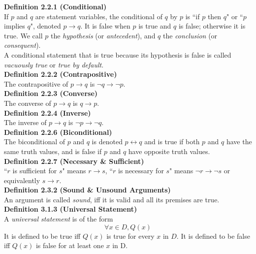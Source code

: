 \documentclass[a4paper]{article}
\newcommand{\subheading}[1]{{\scriptsize\textbf{#1}}}
\begin{document}
\begin{multicols*}{4}
\subheading{Definition 2.2.1 (Conditional)}\\
If $p$ and $q$ are statement variables, the conditional of $q$ by $p$ is ``if
$p$ then $q$" or ``$p$ implies $q$", denoted $p \rightarrow q$. It is false
when $p$ is true and $q$ is false; otherwise it is true. We call $p$ the
\textit{hypothesis} (or \textit{antecedent}), and $q$ the \textit{conclusion}
(or \textit{consequent}).\\

A conditional statement that is true because its hypothesis is false is called
\textit{vacuously true} or \textit{true by default}.\\

\subheading{Definition 2.2.2 (Contrapositive)}\\
The contrapositive of $p \rightarrow q$ is $\neg q \rightarrow \neg p$.\\

\subheading{Definition 2.2.3 (Converse)}\\
The converse of $p \rightarrow q$ is $q \rightarrow p$.\\

\subheading{Definition 2.2.4 (Inverse)}\\
The inverse of $p \rightarrow q$ is $\neg p \rightarrow \neg q$.\\

\subheading{Definition 2.2.6 (Biconditional)}\\
The biconditional of $p$ and $q$ is denoted $p \leftrightarrow q$ and is true if
both $p$ and $q$ have the same truth values, and is false if $p$ and $q$ have
opposite truth values.\\

\subheading{Definition 2.2.7 (Necessary \& Sufficient)}\\
``$r$ is sufficient for $s$" means $r \rightarrow s$, ``$r$ is necessary for
$s$" means $\neg r \rightarrow \neg s$ or equivalently $s \rightarrow r$.\\

\subheading{Definition 2.3.2 (Sound \& Unsound Arguments)}\\
An argument is called \textit{sound}, iff it is valid and all its premises are
true.\\

\subheading{Definition 3.1.3 (Universal Statement)}\\
A \textit{universal statement} is of the form $$\forall x \in D, Q(x)$$ It is
defined to be true iff $Q(x)$ is true for every $x$ in $D$. It is defined to be
false iff $Q(x)$ is false for at least one $x$ in D.\\


\end{multicols*}
\end{document}
